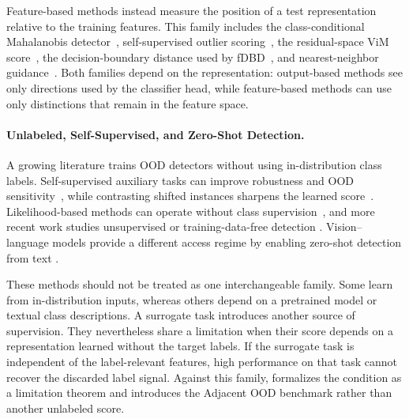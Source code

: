 Feature-based methods instead measure the position of a test representation
relative to the training features. This family includes the class-conditional
Mahalanobis detector~\citep{lee2018simple}, self-supervised outlier
scoring~\citep{sehwag2021ssd}, the residual-space ViM
score~\citep{Wang2022vim}, the decision-boundary distance used by
fDBD~\citep{liu2024fdbd}, and nearest-neighbor
guidance~\citep{park2023nnguide}. Both families depend on the representation:
output-based methods see only directions used by the classifier head, while
feature-based methods can use only distinctions that remain in the feature space.

\paragraph{Unlabeled, Self-Supervised, and Zero-Shot Detection.}
A growing literature trains OOD detectors without using in-distribution class
labels. Self-supervised auxiliary tasks can improve robustness and OOD
sensitivity~\citep{hendrycks2019using,mohseni2020self}, while contrasting shifted
instances sharpens the learned score~\citep{tack2020csi}. Likelihood-based methods
can operate without class supervision~\citep{xiao2020likelihood}, and more recent
work studies unsupervised or training-data-free detection
\citep{liu2023unsupervised,du2024and,du2024does}. Vision--language models provide a
different access regime by enabling zero-shot detection from text
\citep{esmaeilpour2022zero,wang2023clipn}.

These methods should not be treated as one interchangeable family. Some learn from
in-distribution inputs, whereas others depend on a pretrained model or textual
class descriptions. A surrogate task introduces another source of supervision.
They nevertheless share a limitation when their score depends on a representation
learned without the target labels. If the surrogate task is independent of the
label-relevant features, high performance on that task cannot recover the
discarded label signal. Against this family,  formalizes
the condition as a limitation theorem and introduces the Adjacent OOD benchmark
rather than another unlabeled score.

